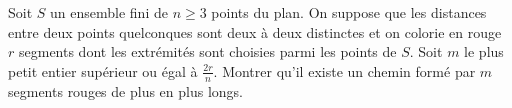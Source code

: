 Soit $S$ un ensemble fini de $n \geq 3$ points du plan. On suppose que les distances entre deux points quelconques sont deux à deux distinctes et on colorie en rouge $r$ segments dont les extrémités sont choisies parmi les points de $S$. Soit $m$ le plus petit entier supérieur ou égal à $\frac{2r}{n}$. Montrer qu'il existe un chemin formé par $m$ segments rouges de plus en plus longs.
